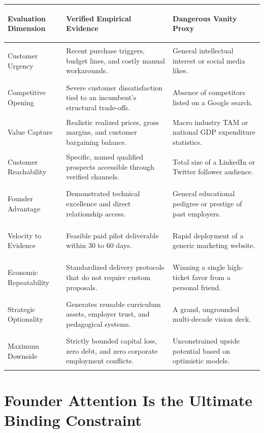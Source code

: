\begin{tcolorbox}[
  enhanced,
  colback=BayesSurface!60,
  colframe=BayesBorder,
  boxrule=0.5pt,
  arc=3pt,
  left=3pt,right=3pt,top=3pt,bottom=3pt,
  boxsep=1pt
]
\scriptsize
\begin{tabularx}{\linewidth}{>{\bfseries\raggedright\arraybackslash}p{2.2cm} >{\raggedright\arraybackslash}p{2.4cm} X}
\toprule
\textbf{Evaluation Dimension} & \textbf{Verified Empirical Evidence} & \textbf{Dangerous Vanity Proxy} \\
\midrule
Customer Urgency & Recent purchase triggers, budget lines, and costly manual workarounds. & General intellectual interest or social media likes. \\
\addlinespace[2pt]
Competitive Opening & Severe customer dissatisfaction tied to an incumbent's structural trade-offs. & Absence of competitors listed on a Google search. \\
\addlinespace[2pt]
Value Capture & Realistic realized prices, gross margins, and customer bargaining balance. & Macro industry TAM or national GDP expenditure statistics. \\
\addlinespace[2pt]
Customer Reachability & Specific, named qualified prospects accessible through verified channels. & Total size of a LinkedIn or Twitter follower audience. \\
\addlinespace[2pt]
Founder Advantage & Demonstrated technical excellence and direct relationship access. & General educational pedigree or prestige of past employers. \\
\addlinespace[2pt]
Velocity to Evidence & Feasible paid pilot deliverable within 30 to 60 days. & Rapid deployment of a generic marketing website. \\
\addlinespace[2pt]
Economic Repeatability & Standardized delivery protocols that do not require custom proposals. & Winning a single high-ticket favor from a personal friend. \\
\addlinespace[2pt]
Strategic Optionality & Generates reusable curriculum assets, employer trust, and pedagogical systems. & A grand, ungrounded multi-decade vision deck. \\
\addlinespace[2pt]
Maximum Downside & Strictly bounded capital loss, zero debt, and zero corporate employment conflicts. & Unconstrained upside potential based on optimistic models. \\
\bottomrule
\end{tabularx}
\end{tcolorbox}

\section{Founder Attention Is the Ultimate Binding Constraint}

